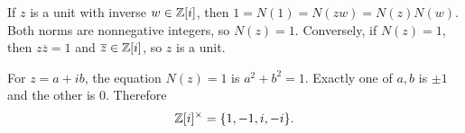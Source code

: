 \documentclass[reqno,11pt]{amsart}
\begin{document}
\begin{example}
If $z$ is a unit with inverse $w\in\mathbb{Z}[i]$, then
$1=N(1)=N(zw)=N(z)N(w)$. Both norms are nonnegative integers, so
$N(z)=1$. Conversely, if $N(z)=1$, then $z\overline{z}=1$ and
$\overline{z}\in\mathbb{Z}[i]$, so $z$ is a unit.

For $z=a+ib$, the equation $N(z)=1$ is $a^2+b^2=1$. Exactly one of
$a,b$ is $\pm1$ and the other is $0$. Therefore
\[
  \mathbb{Z}[i]^\times=\{1,-1,i,-i\}.
\]
\end{example}
\end{document}
